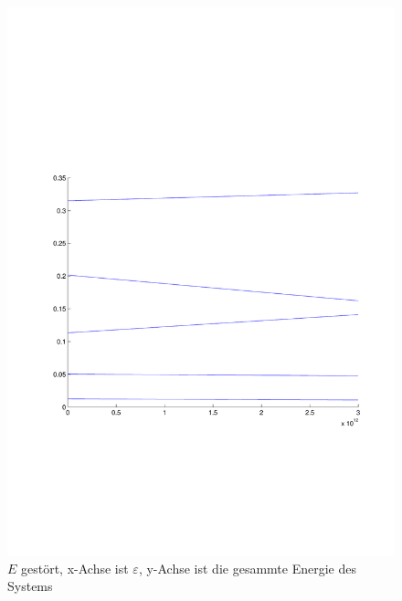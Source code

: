 \begin{refsection}
\begin{figure}
 \centering
 \includegraphics[width=12cm,clip=true,trim=2cm 7cm 1cm 8cm]{efeld/Energie_gestoert.pdf}
 \caption{$E$ gest\"ort, x-Achse ist $\varepsilon$, y-Achse ist die gesammte Energie des Systems}
 \label{abb:efeld_E_gestoert}
\end{figure}







\printbibliography[heading=subbibliography]
\end{refsection}
